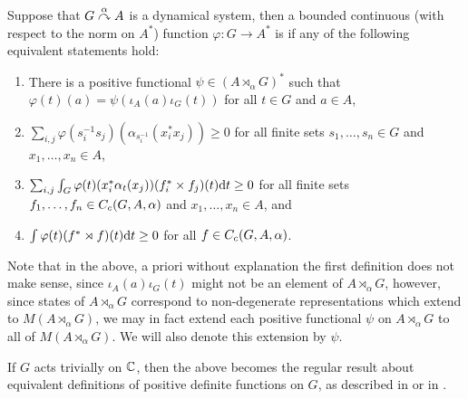 \begin{definition}
Suppose that $G \stackrel{\alpha}{\curvearrowright} A$ is a dynamical system, then a bounded continuous (with respect to the norm on $A^*$) function $\varphi \colon G \to A^*$ is  if any of the following equivalent statements hold:
\begin{enumerate}
	\item There is a positive functional $\psi \in (A \rtimes_\alpha G)^*$ such that $\varphi(t)(a) = \psi(\iota_A(a) \iota_G(t))$ for all $t \in G$ and $a \in A$,
	\item $\sum_{i,j} \varphi (s_i^{-1}s_j)(\alpha_{s_{i}^{-1}}(x_{i}^* x_{j})) \geq 0 $ for all finite sets $s_1,\dots,s_n \in G$ and $x_1,\dots,x_n \in A$,
	\item $\sum_{i,j}\int_G \varphi(t)(x_{i}^*\alpha_t(x_j))(f_i^* \times f_j)(t) \mathrm{d} t \geq 0$ for all finite sets $f_1,\dots,f_n \in C_c(G,A,\alpha)$ and $x_1,\dots,x_n \in A$, and
	\item $\int \varphi(t)(f^* \rtimes f)(t) \mathrm{d} t \geq 0$ for all $f \in C_c(G,A,\alpha)$.
\end{enumerate}
\end{definition}
\begin{remark}
Note that in the above, a priori without explanation the first definition does not make sense, since $\iota_A(a) \iota_G(t)$ might not be an element of $A \rtimes_\alpha G$, however, since states of $A \rtimes_\alpha G$ correspond to non-degenerate representations which extend to $M(A \rtimes_\alpha G)$, we may in fact extend each positive functional $\psi$ on $A \rtimes_\alpha G$ to all of $M(A \rtimes_\alpha G)$. We will also denote this extension by $\psi$. 
\end{remark}
If $G$ acts trivially on $\mathbb{C}$, then the above becomes the regular result about equivalent definitions of positive definite functions on $G$, as described in \cite{folland2016fourier} or in \cite{pedersenalgauto}.

